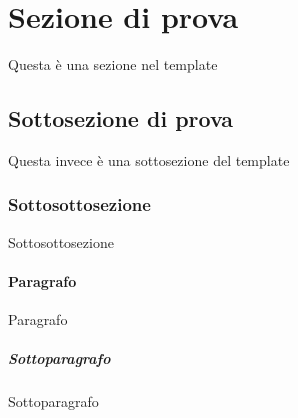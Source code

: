 \section{Sezione di prova}
Questa è una sezione nel template
	\subsection{Sottosezione di prova}
	Questa invece è una sottosezione del template
		\subsubsection{Sottosottosezione}
		Sottosottosezione
			\paragraph{Paragrafo}
			Paragrafo
				\subparagraph{Sottoparagrafo}
				Sottoparagrafo

